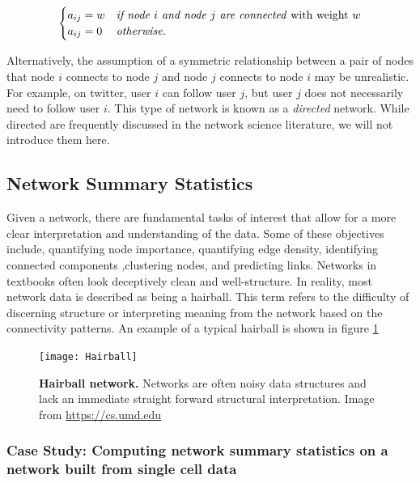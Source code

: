 \[ \begin{cases} 
     a_{ij}=w & \text{\emph{if node $i$ and node $j$ are connected} with weight $w$} \\
      a_{ij}=0 & \text{\emph{otherwise}}.
         \end{cases}
\]

Alternatively, the assumption of a symmetric relationship between a pair of nodes that node $i$ connects to node $j$ and node $j$ connects to node $i$  may be unrealistic. For example, on twitter, user $i$ can follow user $j$, but user $j$ does not necessarily need to follow user $i$. This type of network is known as a \emph{directed} network. While directed are frequently discussed in the network science literature, we will not introduce them here.  

\subsection{Network Summary Statistics}

\indent Given a network, there are fundamental tasks of interest that allow for a more clear interpretation and understanding of the data. Some of these objectives include, quantifying node importance, quantifying edge density, identifying connected components ,clustering nodes, and predicting links. Networks in textbooks often look deceptively clean and well-structure. In reality, most network data is described as being a hairball. This term refers to the difficulty of discerning structure or interpreting meaning from the network based on the connectivity patterns. An example of a typical hairball is shown in figure \ref{fig:Hairball}

\begin{figure}
\begin{center}
\texttt{[image: Hairball]}
\caption{{\bf Hairball network.} Networks are often noisy data structures and lack an immediate straight forward structural interpretation. Image from \url{https://cs.umd.edu}}
\label{fig:Hairball}
\end{center}
\end{figure}

\subsubsection{Case Study: Computing network summary statistics on a network built from single cell data}

